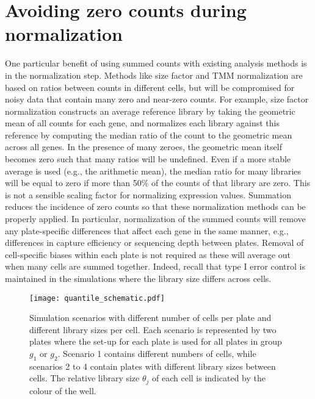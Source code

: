 \documentclass{article}
\begin{document}

\section{Avoiding zero counts during normalization}
One particular benefit of using summed counts with existing analysis methods is in the normalization step.
Methods like size factor and TMM normalization are based on ratios between counts in different cells,
    but will be compromised for noisy data that contain many zero and near-zero counts.
For example, size factor normalization constructs an average reference library by taking the geometric mean of all counts for each gene, 
    and normalizes each library against this reference by computing the median ratio of the count to the geometric mean across all genes.
In the presence of many zeroes, the geometric mean itself becomes zero such that many ratios will be undefined.
Even if a more stable average is used (e.g., the arithmetic mean), the median ratio for many libraries will be equal to zero if more than 50\% of the counts of that library are zero.
This is not a sensible scaling factor for normalizing expression values.
Summation reduces the incidence of zero counts so that these normalization methods can be properly applied.
In particular, normalization of the summed counts will remove any plate-specific differences that affect each gene in the same manner, 
    e.g., differences in capture efficiency or sequencing depth between plates.
Removal of cell-specific biases within each plate is not required as these will average out when many cells are summed together.
Indeed, recall that type I error control is maintained in the simulations where the library size differs across cells.



\begin{figure}[p]
    \begin{center}
        \texttt{[image: quantile\_schematic.pdf]}
    \end{center}
    \caption{
        Simulation scenarios with different number of cells per plate and different library sizes per cell.
        Each scenario is represented by two plates where the set-up for each plate is used for all plates in group $g_1$ or $g_2$.
        Scenario 1 contains different numbers of cells, while scenarios 2 to 4 contain plates with different library sizes between cells.
        The relative library size $\theta_j$ of each cell is indicated by the colour of the well.
    }
    \label{fig:compsim}
\end{figure}
\end{document}
